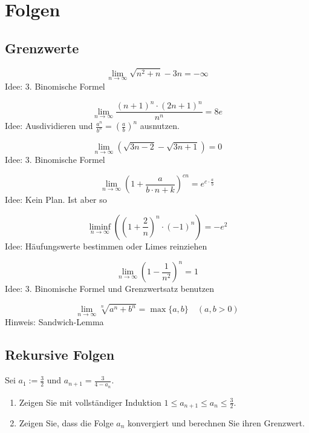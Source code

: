 \section{Folgen}
\subsection{Grenzwerte}
\begin{displaymath}
  \lim_{n \to \infty} {\sqrt{n^2 + n} - 3n} = - \infty
\end{displaymath}
Idee: 3. Binomische Formel

\begin{displaymath}
  \lim_{n \to \infty} \frac{(n+1)^n \cdot (2n+1)^n}{n^n} = 8e
\end{displaymath}
Idee: Ausdividieren und $\frac{a^n}{b^n} = \left( \frac{a}{b}\right) ^n$ ausnutzen.

\begin{displaymath}
  \lim_{n \to \infty} (\sqrt{3n-2} - \sqrt{3n+1}) = 0
\end{displaymath}
Idee: 3. Binomische Formel

\begin{displaymath}
  \lim_{n \to \infty} \left(1 + \frac{a}{b \cdot n + k}\right)^{cn} = e^{c \cdot \frac{a}{b}}
\end{displaymath}
Idee: Kein Plan. Ist aber so

\begin{displaymath}
  \liminf_{n \to \infty} \left(\left(1 + \frac{2}{n}\right)^n \cdot (-1)^n \right) = -e^2
\end{displaymath}
Idee: Häufungswerte bestimmen oder Limes reinziehen

\begin{displaymath}
  \lim_{n \to \infty} \left(1 - \frac{1}{n^2}\right)^n = 1
\end{displaymath}
Idee: 3. Binomische Formel und Grenzwertsatz benutzen

\begin{displaymath}
  \lim_{n \to \infty} \sqrt[n]{a^n + b^n} = \max\{a, b\} \quad (a,b > 0)
\end{displaymath}
Hinweis: Sandwich-Lemma

\subsection{Rekursive Folgen}
Sei $a_1 := \frac{3}{2}$ und $a_{n+1} = \frac{3}{4-a_n}$.
\begin{enumerate}
    \item Zeigen Sie mit vollständiger Induktion $1 \leq a_{n+1} \leq a_n \leq \frac{3}{2}$.
    \item Zeigen Sie, dass die Folge $a_n$ konvergiert und berechnen Sie ihren Grenzwert.
\end{enumerate}

